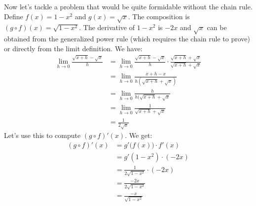\documentclass{article}
\theoremstyle{plain}
\begin{document}
    Now let's tackle a problem that would be quite formidable without the
    chain rule. Define $f(x)=1-x^{2}$ and $g(x)=\sqrt{x}$. The composition
    is $(g\circ{f})(x)=\sqrt{1-x^{2}}$. The derivative of $1-x^{2}$ is $-2x$
    and $\sqrt{x}$ can be obtained from the generalized power rule (which
    requires the chain rule to prove) or directly from the limit definition.
    We have:
    \begin{align}
        \lim_{h\rightarrow{0}}
        \frac{\sqrt{x+h}-\sqrt{x}}{h}
        &=\lim_{h\rightarrow{0}}
        \frac{\sqrt{x+h}-\sqrt{x}}{h}\cdot
        \frac{\sqrt{x+h}+\sqrt{x}}{\sqrt{x+h}+\sqrt{x}}\\
        &=\lim_{h\rightarrow{0}}
        \frac{x+h-x}{h(\sqrt{x+h}+\sqrt{x})}\\
        &=\lim_{h\rightarrow{0}}
        \frac{h}{h(\sqrt{x+h}+\sqrt{x}}\\
        &=\lim_{h\rightarrow{0}}\frac{1}{\sqrt{x+h}+\sqrt{x}}\\
        &=\frac{1}{2\sqrt{x}}
    \end{align}
    Let's use this to compute $(g\circ{f})'(x)$. We get:
    \begin{align}
        (g\circ{f})'(x)
        &=g'\big(f(x)\big)\cdot{f}'(x)
            \tag{Chain Rule}\\
        &=g'(1-x^{2})\cdot(-2x)
            \tag{Substitute $f$ and $f'$}\\
        &=\frac{1}{2\sqrt{1-x^{2}}}\cdot(-2x)
            \tag{Substitute $g'$}\\
        &=\frac{-2x}{2\sqrt{1-x^{2}}}
            \tag{Multiply}\\
        &=\frac{-x}{\sqrt{1-x^{2}}}
            \tag{Simplify}
    \end{align}
\end{document}
